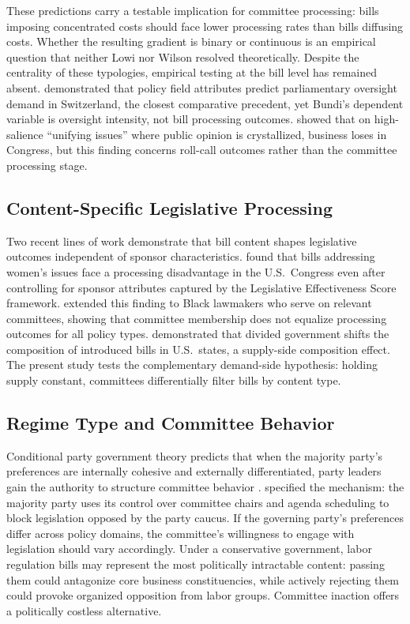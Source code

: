 \documentclass[11pt]{article}
\begin{document}
These predictions carry a testable implication for committee processing: bills imposing concentrated costs should face lower processing rates than bills diffusing costs. Whether the resulting gradient is binary or continuous is an empirical question that neither Lowi nor Wilson resolved theoretically. Despite the centrality of these typologies, empirical testing at the bill level has remained absent. \citet{bundi2017} demonstrated that policy field attributes predict parliamentary oversight demand in Switzerland, the closest comparative precedent, yet Bundi's dependent variable is oversight intensity, not bill processing outcomes. \citet{smith1999} showed that on high-salience ``unifying issues'' where public opinion is crystallized, business loses in Congress, but this finding concerns roll-call outcomes rather than the committee processing stage.

\subsection{Content-Specific Legislative Processing}

Two recent lines of work demonstrate that bill content shapes legislative outcomes independent of sponsor characteristics. \citet{volden2016} found that bills addressing women's issues face a processing disadvantage in the U.S.\ Congress even after controlling for sponsor attributes captured by the Legislative Effectiveness Score framework. \citet{peay2020} extended this finding to Black lawmakers who serve on relevant committees, showing that committee membership does not equalize processing outcomes for all policy types. \citet{craig2023} demonstrated that divided government shifts the composition of introduced bills in U.S.\ states, a supply-side composition effect. The present study tests the complementary demand-side hypothesis: holding supply constant, committees differentially filter bills by content type.

\subsection{Regime Type and Committee Behavior}

Conditional party government theory predicts that when the majority party's preferences are internally cohesive and externally differentiated, party leaders gain the authority to structure committee behavior \citep{aldrich2001}. \citet{cox2005} specified the mechanism: the majority party uses its control over committee chairs and agenda scheduling to block legislation opposed by the party caucus. If the governing party's preferences differ across policy domains, the committee's willingness to engage with legislation should vary accordingly. Under a conservative government, labor regulation bills may represent the most politically intractable content: passing them could antagonize core business constituencies, while actively rejecting them could provoke organized opposition from labor groups. Committee inaction offers a politically costless alternative.
\end{document}
